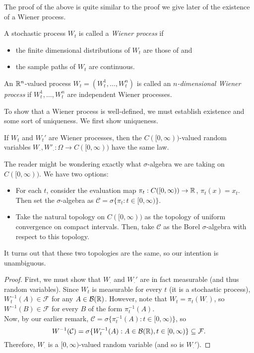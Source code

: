 The proof of the above is quite similar to the proof we give later of the existence of a Wiener process.

\begin{fdef}
	A stochastic process $W_t$ is called a \textit{Wiener process} if
	\begin{itemize}
		\item the finite dimensional distributions of $W_t$ are those of  and
		\item the sample paths of $W_t$ are continuous.
	\end{itemize}
\end{fdef}

An $\mathbb{R}^n$-valued process $W_t = (W_t^1,\ldots,W_t^n)$ is called an \textit{$n$-dimensional Wiener process} if $W_t^1,\ldots,W_t^n$ are independent Wiener processes.

To show that a Wiener process is well-defined, we must establish existence and some sort of uniqueness. We first show uniqueness.

\begin{lemma}
	If $W_t$ and $W_t'$ are Wiener processes, then the $C([0,\infty))$-valued random variables $W_{\cdot},W'_{\cdot}:\Omega\to C([0,\infty))$ have the same law.
\end{lemma}

The reader might be wondering exactly what $\sigma$-algebra we are taking on $C([0,\infty))$. We have two options:
\begin{itemize}
	\item For each $t$, consider the evaluation map $\pi_t:C([0,\infty))\to\mathbb{R}$, $\pi_t(x)=x_t$. Then set the $\sigma$-algebra as $\mathcal{C}=\sigma\{\pi_t : t\in[0,\infty)\}$.
	\item Take the natural topology on $C([0,\infty))$ as the topology of uniform convergence on compact intervals. Then, take $\mathcal{C}$ as the Borel $\sigma$-algebra with respect to this topology.
\end{itemize}
It turns out that these two topologies are the same, so our intention is unambiguous.

\begin{proof}
	First, we must show that $W_{\cdot}$ and $W_{\cdot}'$ are in fact measurable (and thus random variables). Since $W_t$ is measurable for every $t$ (it is a stochastic process), $W_t^{-1}(A)\in\mathcal{F}$ for any $A\in\mathcal{B}(\mathbb{R})$. However, note that $W_t = \pi_t(W_\cdot)$, so $W^{-1}(B)\in\mathcal{F}$ for every $B$ of the form $\pi_t^{-1}(A)$.\\
	Now, by our earlier remark, $\mathcal{C} = \sigma\{\pi_t^{-1}(A) : t\in[0,\infty)\}$, so
	\[ W^{-1}(\mathcal{C}) = \sigma\{W_t^{-1}(A) : A\in\mathcal{B}(\mathbb{R}), t\in[0,\infty)\}\subseteq \mathcal{F}. \]
	Therefore, $W_{\cdot}$ is a $[0,\infty)$-valued random variable (and so is $W_{\cdot}'$).
\end{proof}